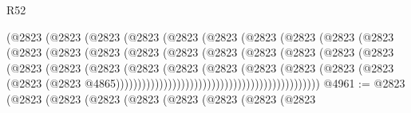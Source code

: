 \begin{lexlean}{R52}
\begin{coremodule}
{{{{{{{{{{{{{{{{{{{{{{{{{{{{{{{{{{{{{{{{{{{{{{{{{{{{{{{{{{{{{{{{{{{{{{{{{{{{{{{{{{{{{{{{{{{{{{{{{{{{{{{{{{{{{{{{{{{{{{{{{{{{{{{{{{{{{{{{{{{{{{{{{{{{{{{{{{{{{{{{{{{{{{{{{{{{{{{{{{{{{{{{{{{{{{{{{{{{{{                                  (@2823
                                    (@2823
                                      (@2823
                                        (@2823
                                          (@2823
                                            (@2823
                                              (@2823
                                                (@2823
                                                  (@2823
                                                    (@2823
                                                      (@2823
                                                        (@2823
                                                          (@2823
                                                            (@2823
                                                              (@2823
                                                                (@2823
                                                                  (@2823
                                                                    (@2823
                                                                      (@2823
                                                                        (@2823
                                                                          (@2823
                                                                            (@2823
                                                                              (@2823
                                                                                (@2823
                                                                                  (@2823
                                                                                    (@2823
                                                                                      (@2823
                                                                                        (@2823
                                                                                          (@2823
                                                                                            (@2823
                                                                                              (@2823
                                                                                                (@2823
                                                                                                  @4865)))))))))))))))))))))))))))))))))))))))))))))))
@4961 := @2823
    (@2823
      (@2823
        (@2823
          (@2823
            (@2823
              (@2823
                (@2823
                  (@2823
}}}}}}}}}}}}}}}}}}}}}}}}}}}}}}}}}}}}}}}}}}}}}}}}}}}}}}}}}}}}}}}}}}}}}}}}}}}}}}}}}}}}}}}}}}}}}}}}}}}}}}}}}}}}}}}}}}}}}}}}}}}}}}}}}}}}}}}}}}}}}}}}}}}}}}}}}}}}}}}}}}}}}}}}}}}}}}}}}}}}}}}}}}}}}}}}}}}}}}
\end{coremodule}
\end{lexlean}
